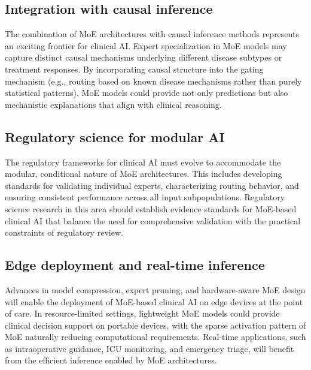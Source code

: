 \subsection*{Integration with causal inference}

The combination of MoE architectures with causal inference methods represents an exciting frontier for clinical AI. Expert specialization in MoE models may capture distinct causal mechanisms underlying different disease subtypes or treatment responses. By incorporating causal structure into the gating mechanism (e.g., routing based on known disease mechanisms rather than purely statistical patterns), MoE models could provide not only predictions but also mechanistic explanations that align with clinical reasoning.

\subsection*{Regulatory science for modular AI}

The regulatory frameworks for clinical AI must evolve to accommodate the modular, conditional nature of MoE architectures. This includes developing standards for validating individual experts, characterizing routing behavior, and ensuring consistent performance across all input subpopulations. Regulatory science research in this area should establish evidence standards for MoE-based clinical AI that balance the need for comprehensive validation with the practical constraints of regulatory review.

\subsection*{Edge deployment and real-time inference}

Advances in model compression, expert pruning, and hardware-aware MoE design will enable the deployment of MoE-based clinical AI on edge devices at the point of care. In resource-limited settings, lightweight MoE models could provide clinical decision support on portable devices, with the sparse activation pattern of MoE naturally reducing computational requirements. Real-time applications, such as intraoperative guidance, ICU monitoring, and emergency triage, will benefit from the efficient inference enabled by MoE architectures.
